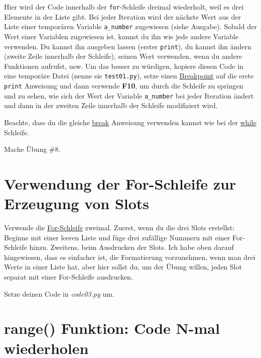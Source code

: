 \documentclass[
]{book}
\begin{document}
Hier wird der Code innerhalb der \texttt{for}-Schleife dreimal wiederholt, weil es drei Elemente in der Liste gibt. Bei jeder Iteration wird der nächste Wert aus der Liste einer temporären Variable \texttt{a\_number} zugewiesen (siehe Ausgabe). Sobald der Wert einer Variablen zugewiesen ist, kannst du ihn wie jede andere Variable verwenden. Du kannst ihn ausgeben lassen (erster \texttt{print}), du kannst ihn ändern (zweite Zeile innerhalb der Schleife), seinen Wert verwenden, wenn du andere Funktionen aufrufst, usw. Um das besser zu würdigen, kopiere diesen Code in eine temporäre Datei (nenne sie \texttt{test01.py}), setze einen \protect\hyperlink{debugging}{Breakpoint} auf die erste \texttt{print} Anweisung und dann verwende \textbf{F10}, um durch die Schleife zu springen und zu sehen, wie sich der Wert der Variable \texttt{a\_number} bei jeder Iteration ändert und dann in der zweiten Zeile innerhalb der Schleife modifiziert wird.

Beachte, dass du die gleiche \href{https://docs.python.org/3/tutorial/controlflow.html?highlight=loop\#break-and-continue-statements-and-else-clauses-on-loops}{break} Anweisung verwenden kannst wie bei der \href{https://docs.python.org/3/reference/compound_stmts.html\#the-while-statement}{while} Schleife.

Mache Übung \#8.

\hypertarget{verwendung-der-for-schleife-zur-erzeugung-von-slots}{%
\section{Verwendung der For-Schleife zur Erzeugung von Slots}\label{verwendung-der-for-schleife-zur-erzeugung-von-slots}}

Verwende die \href{https://docs.python.org/3/tutorial/controlflow.html?highlight=loop\#for-statements}{For-Schleife} zweimal. Zuerst, wenn du die drei Slots erstellst: Beginne mit einer leeren Liste und füge drei zufällige Nummern mit einer For-Schleife hinzu. Zweitens, beim Ausdrucken der Slots. Ich habe oben darauf hingewiesen, dass es einfacher ist, die Formatierung vorzunehmen, wenn man drei Werte in einer Liste hat, aber hier sollst du, um der Übung willen, jeden Slot separat mit einer For-Schleife ausdrucken.

Setze deinen Code in \emph{code03.py} um.

\hypertarget{range}{%
\section{range() Funktion: Code N-mal wiederholen}\label{range}}
\end{document}
